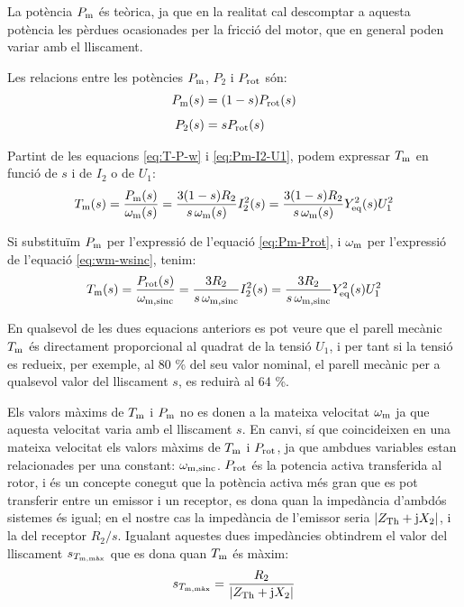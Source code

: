 La potència $P_\mathrm{m}$  és teòrica, ja que en la realitat cal descomptar a aquesta potència les pèrdues ocasionades per la fricció del motor, que en general poden variar amb el lliscament.

Les relacions entre les potències   $P_\mathrm{m}$,  $P_2$ i $P_\mathrm{rot}$ són:
\begin{subequations}
\begin{align}
    P_\mathrm{m}(s) &=  (1-s) P_\mathrm{rot}(s) \label{eq:Pm-Prot} \\[1ex]
    P_2(s) &=   s P_\mathrm{rot}(s)
\end{align}
\end{subequations}


Partint de les equacions \eqref{eq:T-P-w} i \eqref{eq:Pm-I2-U1}, podem expressar  $T_\mathrm{m}$ en funció de $s$ i de $I_2$ o de $U_1$:
\begin{equation}
    T_\mathrm{m}(s)  =  \frac{P_\mathrm{m}(s)}{\omega_\mathrm{m}(s)} =  \frac{3(1-s) R_2}{s\,\omega_\mathrm{m}(s)} I_2^2(s) =
     \frac{3(1-s) R_2}{s\,\omega_\mathrm{m}(s)} Y_\mathrm{eq}^2(s) U_1^2
\end{equation}

Si substituïm $P_\mathrm{m}$ per l'expressió de l'equació \eqref{eq:Pm-Prot}, i $\omega_\mathrm{m}$ per l'expressió de l'equació \eqref{eq:wm-wsinc}, tenim:
\begin{equation}
    T_\mathrm{m}(s)  =  \frac{P_\mathrm{rot}(s)}{\omega_\mathrm{m,sinc}} =   \frac{3 R_2}{s\,\omega_\mathrm{m,sinc}} I_2^2(s) =
     \frac{3 R_2}{s\,\omega_\mathrm{m,sinc}} Y_\mathrm{eq}^2(s) U_1^2 \label{eq:Tm-Prot-ws}
\end{equation}

En qualsevol de les dues equacions anteriors es pot veure que el parell mecànic $T_\mathrm{m}$ és directament proporcional al quadrat de la tensió $U_1$, i per tant si la tensió es redueix, per exemple, al 80 \% del seu valor nominal, el parell mecànic per a qualsevol valor del lliscament $s$,  es reduirà al 64 \%.

Els valors màxims de $T_\mathrm{m}$ i $P_\mathrm{m}$ no es donen a la mateixa velocitat  $\omega_\mathrm{m}$ ja que aquesta velocitat varia amb el lliscament $s$. En canvi, sí que coincideixen en una mateixa velocitat els valors  màxims de $T_\mathrm{m}$ i $P_\mathrm{rot}$, ja que ambdues variables estan relacionades per una constant: $\omega_\mathrm{m,sinc}$. $P_\mathrm{rot}$ és la potencia activa transferida al rotor, i és un concepte conegut que la potència activa més gran que es pot transferir entre un emissor i un receptor, es dona quan la impedància d'ambdós sistemes és igual; en el nostre cas la impedància de l'emissor seria $|Z_\mathrm{Th} + \mathrm{j} X_2|$, i la del receptor $R_2/s$. Igualant aquestes dues impedàncies obtindrem el valor del lliscament $s_{T_\mathrm{m,\text{màx}}}$ que es dona quan $T_\mathrm{m}$ és màxim:
\begin{equation}
    s_{T_\mathrm{m,\text{màx}}} =  \frac{R_2}{|Z_\mathrm{Th} + \mathrm{j} X_2|} \label{eq:s-T-max}
\end{equation}


